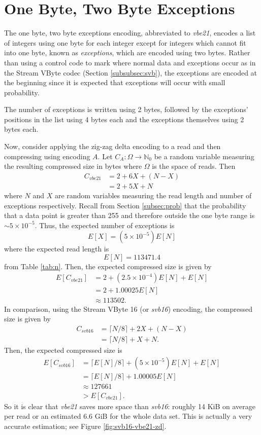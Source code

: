 \section{One Byte, Two Byte Exceptions}
\label{sec:vbbe21}

The one byte, two byte exceptions encoding, abbreviated to \textit{vbe21}, encodes a list of integers using one byte for each integer except for integers which cannot fit into one byte, known as \textit{exceptions}, which are encoded using two bytes. Rather than using a control code to mark where normal data and exceptions occur as in the Stream VByte codec (Section \ref{subsubsec:svb}), the exceptions are encoded at the beginning since it is expected that exceptions will occur with small probability.

The number of exceptions is written using 2 bytes, followed by the exceptions' positions in the list using 4 bytes each and the exceptions themselves using 2 bytes each.

Now, consider applying the zig-zag delta encoding to a read and then compressing using encoding $A$. Let $C_A:\Omega\to\mathbb{N}_0$ be a random variable measuring the resulting compressed size in bytes where $\Omega$ is the space of reads. Then
\begin{align*}
	C_{vbe21} &= 2 + 6X + (N - X)\\
	&= 2 + 5X + N
\end{align*}
where $N$ and $X$ are random variables measuring the read length and number of exceptions respectively.
Recall from Section \ref{subsec:prob} that the probability that a data point is greater than 255 and therefore outside the one byte range is $\sim 5\times 10^{-5}$. Thus, the expected number of exceptions is
\[ E[X] = (5 \times 10^{-5})E[N] \]
where the expected read length is
\[ E[N] = 113471.4 \]
from Table \ref{tab:n}.
Then, the expected compressed size is given by
\begin{align*}
	E[C_{vbe21}] &= 2 + (2.5\times 10^{-4})E[N]+ E[N]\\
	&= 2 + 1.00025E[N]\\
	&\approx 113502.
\end{align*}
In comparison, using the Stream VByte 16 (or \textit{svb16}) encoding, the compressed size is given by
\begin{align*}
	C_{svb16} &= \lceil N/8 \rceil + 2X + (N - X)\\
	&= \lceil N/8 \rceil + X + N.
\end{align*}
Then, the expected compressed size is
\begin{align*}
	E[C_{svb16}] &= \lceil E[N]/8 \rceil + (5 \times 10^{-5})E[N] + E[N]\\
	&= \lceil E[N]/8 \rceil + 1.00005E[N]\\
	&\approx 127661\\
	&> E[C_{vbe21}].
\end{align*}
So it is clear that \textit{vbe21} saves more space than \textit{svb16}: roughly 14 KiB on average per read or an estimated 6.6 GiB for the whole data set. This is actually a very accurate estimation; see Figure \ref{fig:svb16-vbe21-zd}.

